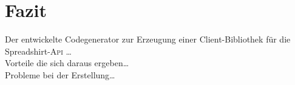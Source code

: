 \section{Fazit}
\label{sec:conclusion}

Der entwickelte Codegenerator zur Erzeugung einer Client-Bibliothek für die Spreadshirt-\textsc{Api} \ldots\\
Vorteile die sich daraus ergeben\ldots\\
Probleme bei der Erstellung\ldots
